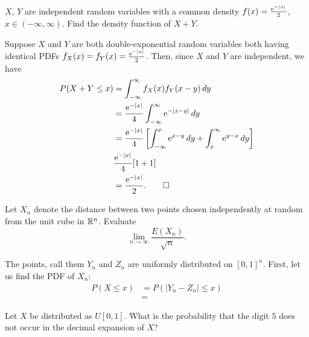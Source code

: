 \begin{problem}
  \(X\), \(Y\) are independent random variables with a common density
  \(f(x)=\frac{\mathrm{e}^{-|x|}}{2}\), \(x\in(-\infty,\infty)\). Find the
  density function of \(X+Y\).
\end{problem}
\begin{solution*}
  Suppose \(X\) and \(Y\) are both double-exponential random variables both
  having identical PDFs \(f_X(x)=f_Y(x)=\frac{\mathrm{e}^{-|x|}}{2}\). Then,
  since \(X\) and \(Y\) are independent, we have
  \begin{align*}
    P(X+Y\leq x)
    &=\int_{-\infty}^\infty f_X(x)f_Y(x-y)\mathop{}\!d y\\
    &=\frac{\mathrm{e}^{-|x|}}{4}\int_{-\infty}^\infty\mathrm{e}^{-|x-y|}\mathop{}\!d y\\
    &=\frac{\mathrm{e}^{-|x|}}{4}
      \left[
      \int_{-\infty}^x\mathrm{e}^{x-y}\mathop{}\!d y
      +\int_x^\infty\mathrm{e}^{y-x}\mathop{}\!d y
      \right]\\
    &\frac{\mathrm{e}^{-|x|}}{4}[1+1]\\
    &=\frac{\mathrm{e}^{-|x|}}{2}.\qedhere
  \end{align*}
\end{solution*}

\begin{problem}
  Let \(X_n\) denote the distance between two points chosen independently
  at random from the unit cube in \(\mathbb{R}^n\). Evaluate
  \[
    \lim_{n\to\infty}\frac{E(X_n)}{\sqrt{n}}.
  \]
\end{problem}
\begin{solution*}
 The points, call them \(Y_n\) and \(Z_n\) are uniformly distributed on
  \([0,1]^n\). First, let us find the PDF of \(X_n\):
  \begin{align*}
    P(X\leq x)
    &=P\left(|Y_n-Z_n|\leq x\right)\\
    &=
  \end{align*}
\end{solution*}

\begin{problem}
  Let \(X\) be distributed as \(U[0,1]\). What is the probability that the
  digit \(5\) does not occur in the decimal expansion of \(X\)?
\end{problem}
\begin{solution*}

\end{solution*}

